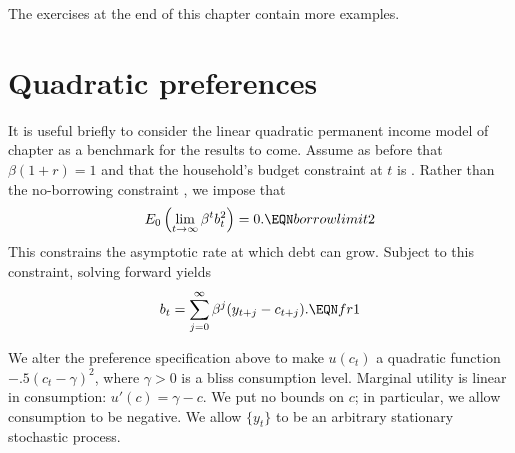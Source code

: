 The exercises at the end of this chapter contain more
examples.

\section{Quadratic preferences}

It is useful briefly to consider the linear quadratic permanent
income model of chapter  as a benchmark for the results to come.  Assume as
before that $\beta(1+r)=1$ and that the household's budget
constraint at $t$ is . Rather than the no-borrowing
constraint , we impose that
 $$E_0\left( \lim_{t\rightarrow \infty}
 \beta^t b_t^2   \right)
= 0. \EQN borrowlimit2 $$  This constrains
the asymptotic rate at which debt can grow.
Subject to this constraint, solving 
forward yields
$$ b_t = \sum_{j=0}^\infty \beta^j (y_{t+j} - c_{t+j}).
\EQN fr1 $$

 We alter the preference specification
above to make $u(c_t) $ a quadratic function
$-.5 (c_t - \gamma)^2$, where $\gamma >0$ is a bliss
consumption level. Marginal utility is
linear in consumption: $u'(c) = \gamma - c$.
We put no bounds on $c$; in particular, we allow
consumption to be negative.  We allow $\{y_t\}$
to be an arbitrary stationary stochastic process.

